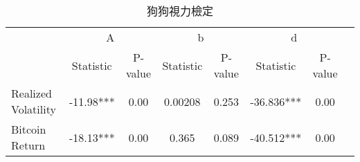 
\begin{table}[htbp]

\caption{狗狗視力檢定}
\begin{center}%

\label{3-1}
\begin{adjustbox}{max width=1\textwidth}

\begin{tabular}{l c c c c c c  p{0cm} }
\toprule



& \multicolumn{2}{c}{A}& \multicolumn{2}{c}{b} & \multicolumn{2}{c}{d} \\ 
\cmidrule(lr){2-7}
& Statistic &  P-value & Statistic &  P-value & Statistic &  P-value  \\
\midrule
Realized Volatility &-11.98*** &0.00 &0.00208 &0.253 &-36.836*** &0.00 \\
Bitcoin Return &-18.13*** &0.00 &0.365 &0.089 &-40.512*** &0.00 \\
        
\bottomrule

\end{tabular}
\end{adjustbox}
\end{center}



\end{table}

